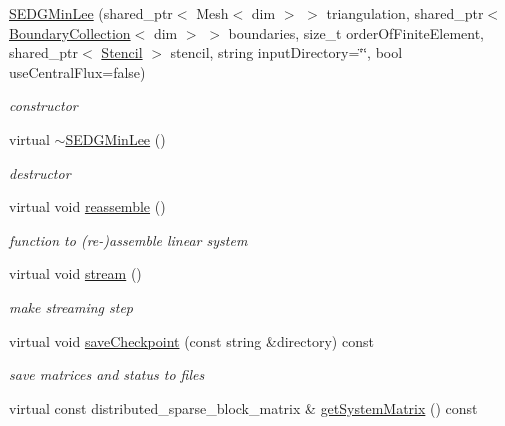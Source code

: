 \begin{DoxyCompactItemize}
\item 
\hyperlink{classnatrium_1_1SEDGMinLee_a6010ff397c7ea56751187084ad6e7ed0}{SEDGMinLee} (shared\_\-ptr$<$ Mesh$<$ dim $>$ $>$ triangulation, shared\_\-ptr$<$ \hyperlink{classnatrium_1_1BoundaryCollection}{BoundaryCollection}$<$ dim $>$ $>$ boundaries, size\_\-t orderOfFiniteElement, shared\_\-ptr$<$ \hyperlink{classnatrium_1_1Stencil}{Stencil} $>$ stencil, string inputDirectory=\char`\"{}\char`\"{}, bool useCentralFlux=false)
\begin{DoxyCompactList}\small\item\em constructor \item\end{DoxyCompactList}\item 
\hypertarget{classnatrium_1_1SEDGMinLee_a6c55a31bc4cb0e314876af7251ad8ce3}{
virtual \hyperlink{classnatrium_1_1SEDGMinLee_a6c55a31bc4cb0e314876af7251ad8ce3}{$\sim$SEDGMinLee} ()}
\label{classnatrium_1_1SEDGMinLee_a6c55a31bc4cb0e314876af7251ad8ce3}

\begin{DoxyCompactList}\small\item\em destructor \item\end{DoxyCompactList}\item 
virtual void \hyperlink{classnatrium_1_1SEDGMinLee_a5fa8b34df3c3bdd9f492a1e555effbe4}{reassemble} ()
\begin{DoxyCompactList}\small\item\em function to (re-\/)assemble linear system \item\end{DoxyCompactList}\item 
\hypertarget{classnatrium_1_1SEDGMinLee_a04707d696f7f466f17e3de055187ecd9}{
virtual void \hyperlink{classnatrium_1_1SEDGMinLee_a04707d696f7f466f17e3de055187ecd9}{stream} ()}
\label{classnatrium_1_1SEDGMinLee_a04707d696f7f466f17e3de055187ecd9}

\begin{DoxyCompactList}\small\item\em make streaming step \item\end{DoxyCompactList}\item 
virtual void \hyperlink{classnatrium_1_1SEDGMinLee_ab3cf80e18230ee7f08f4ed9883b9dadd}{saveCheckpoint} (const string \&directory) const 
\begin{DoxyCompactList}\small\item\em save matrices and status to files \item\end{DoxyCompactList}\item 
\hypertarget{classnatrium_1_1SEDGMinLee_adcf3f6321cbf27f6c540a6c5f21c7cb0}{
virtual const distributed\_\-sparse\_\-block\_\-matrix \& \hyperlink{classnatrium_1_1SEDGMinLee_adcf3f6321cbf27f6c540a6c5f21c7cb0}{getSystemMatrix} () const }
\label{classnatrium_1_1SEDGMinLee_adcf3f6321cbf27f6c540a6c5f21c7cb0}


\end{DoxyCompactItemize}
